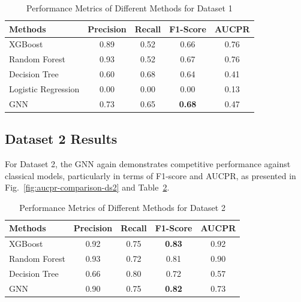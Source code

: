 \documentclass[conference]{IEEEtran}
\begin{document}
\begin{table}[htbp]
\caption{Performance Metrics of Different Methods for Dataset 1}
\centering
\begin{tabular}{lcccc}
\toprule
\textbf{Methods} & \textbf{Precision} & \textbf{Recall} & \textbf{F1-Score} & \textbf{AUCPR} \\
\midrule
XGBoost & 0.89 & 0.52 & 0.66 & 0.76 \\
Random Forest & 0.93 & 0.52 & 0.67 & 0.76 \\
Decision Tree & 0.60 & 0.68 & 0.64 & 0.41 \\
Logistic Regression & 0.00 & 0.00 & 0.00 & 0.13 \\
GNN & 0.73 & 0.65 & \textbf{0.68} & 0.47 \\
\bottomrule
\end{tabular}
\label{tab:metrics-ds1}
\end{table}


\subsection{Dataset 2 Results}

For Dataset 2, the GNN again demonstrates competitive performance against classical models, particularly in terms of F1-score and AUCPR, as presented in Fig.~\ref{fig:aucpr-comparison-ds2} and Table~\ref{tab:metrics-ds2}.

\begin{table}[htbp]
\caption{Performance Metrics of Different Methods for Dataset 2}
\centering
\begin{tabular}{lcccc}
\toprule
\textbf{Methods} & \textbf{Precision} & \textbf{Recall} & \textbf{F1-Score} & \textbf{AUCPR} \\
\midrule
XGBoost & 0.92 & 0.75 & \textbf{0.83} & 0.92 \\
Random Forest & 0.93 & 0.72 & 0.81 & 0.90 \\
Decision Tree & 0.66 & 0.80 & 0.72 & 0.57 \\
GNN & 0.90 & 0.75 & \textbf{0.82} & 0.73 \\
\bottomrule
\end{tabular}
\label{tab:metrics-ds2}
\end{table}
\end{document}

